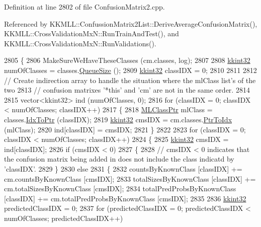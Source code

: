 Definition at line 2802 of file Confusion\+Matrix2.\+cpp.



Referenced by K\+K\+M\+L\+L\+::\+Confussion\+Matrix2\+List\+::\+Derive\+Average\+Confusion\+Matrix(), K\+K\+M\+L\+L\+::\+Cross\+Validation\+Mx\+N\+::\+Run\+Train\+And\+Test(), and K\+K\+M\+L\+L\+::\+Cross\+Validation\+Mx\+N\+::\+Run\+Validations().


\begin{DoxyCode}
2805 \{
2806   MakeSureWeHaveTheseClasses (cm.classes, log);
2807 
2808   \hyperlink{namespace_k_k_b_a8fa4952cc84fda1de4bec1fbdd8d5b1b}{kkint32}  numOfClasses = classes.\hyperlink{class_k_k_b_1_1_k_k_queue_a1dab601f75ee6a65d97f02bddf71c40d}{QueueSize} ();
2809   \hyperlink{namespace_k_k_b_a8fa4952cc84fda1de4bec1fbdd8d5b1b}{kkint32}  classIDX = 0;
2810 
2811 
2812   \textcolor{comment}{//  Create indirection array to handle the situation where the mlClass list's of the two }
2813   \textcolor{comment}{// confusion matrixes '*this'  and  'cm'  are not in the same order.}
2814 
2815   vector<kkint32>  ind (numOfClasses, 0);
2816   \textcolor{keywordflow}{for}  (classIDX = 0;  classIDX < numOfClasses;  classIDX++)
2817   \{
2818     \hyperlink{class_k_k_m_l_l_1_1_m_l_class}{MLClassPtr} mlClass = classes.\hyperlink{class_k_k_b_1_1_k_k_queue_acce2bdd8b3327e38266cf198382cd852}{IdxToPtr} (classIDX);
2819     \hyperlink{namespace_k_k_b_a8fa4952cc84fda1de4bec1fbdd8d5b1b}{kkint32}  cmsIDX = cm.classes.\hyperlink{class_k_k_b_1_1_k_k_queue_ac7c26abdf599669a4b0898534f735f99}{PtrToIdx} (mlClass);
2820     ind[classIDX] = cmsIDX;
2821   \}
2822 
2823   \textcolor{keywordflow}{for}  (classIDX = 0;  classIDX < numOfClasses;  classIDX++)
2824   \{
2825     \hyperlink{namespace_k_k_b_a8fa4952cc84fda1de4bec1fbdd8d5b1b}{kkint32} cmsIDX = ind[classIDX];
2826     \textcolor{keywordflow}{if}  (cmsIDX < 0)
2827     \{
2828       \textcolor{comment}{// cmsIDX < 0 indicates that the confusion matrix being added in does not include the class indicatd
       by 'classIDX'.}
2829     \}
2830     \textcolor{keywordflow}{else}
2831     \{
2832     countsByKnownClass         [classIDX] += cm.countsByKnownClass         [cmsIDX];
2833     totalSizesByKnownClass     [classIDX] += cm.totalSizesByKnownClass     [cmsIDX];
2834     totalPredProbsByKnownClass [classIDX] += cm.totalPredProbsByKnownClass [cmsIDX];
2835 
2836     \hyperlink{namespace_k_k_b_a8fa4952cc84fda1de4bec1fbdd8d5b1b}{kkint32} predictedClassIDX = 0;
2837     \textcolor{keywordflow}{for}  (predictedClassIDX = 0;   predictedClassIDX  < numOfClasses;  predictedClassIDX++)

\end{DoxyCode}
